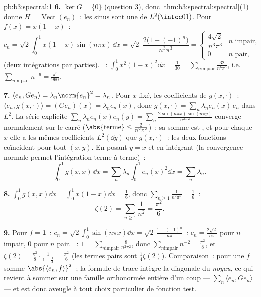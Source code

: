 \begin{solution}{pb:b3:spectral:1}
\textbf{6.} $\ker G = \{0\}$ (question 3), donc
\cref{thm:b3:spectral:spectral}(1) donne $H =
\overline{\operatorname{Vect}}(e_n)$~: les sinus sont une
 de $L^2(\intcc01)$. Pour $f(x) = x(1 -
x)$~:
\[
c_n = \sqrt2\int_0^1x(1-x)\sin(n\pi x)\,\dd x
= \sqrt2\;\frac{2\bigl(1 - (-1)^n\bigr)}{n^3\pi^3}
= \begin{cases}\dfrac{4\sqrt2}{n^3\pi^3} & n \text{ impair},\\
0 & n \text{ pair},\end{cases}
\]
(deux intégrations par parties). ~:
$\int_0^1x^2(1-x)^2\dd x = \frac1{30} = \sum_{n \text{
impair}}\frac{32}{n^6\pi^6}$, i.e.\ $\sum_{n\text{
impair}}n^{-6} = \frac{\pi^6}{960}$.

\textbf{7.} $\langle e_n, Ge_n\rangle = \lambda_n\norm{e_n}^2
= \lambda_n$. Pour $x$ fixé, les coefficients de $g(x,
\cdot)$~: $\langle e_n, g(x,\cdot)\rangle = (Ge_n)(x) =
\lambda_ne_n(x)$, donc $g(x,\cdot) =
\sum_n\lambda_ne_n(x)\,e_n$ dans $L^2$. La série explicite
$\sum_n\lambda_ne_n(x)e_n(y) = \sum_n\frac{2\sin(n\pi
x)\sin(n\pi y)}{n^2\pi^2}$ converge normalement sur le carré
($\abs{\text{terme}} \leq \frac2{n^2\pi^2}$)~: sa somme est
, et pour chaque $x$ elle a les mêmes coefficients
$L^2(\dd y)$ que $g(x, \cdot)$~: les deux fonctions
 coïncident pour tout $(x, y)$. En posant $y = x$
et en intégrant (la convergence normale permet
l'intégration terme à terme)~:
\[
\int_0^1g(x,x)\,\dd x =
\sum_n\lambda_n\int_0^1e_n(x)^2\dd x = \sum_n\lambda_n .
\]

\textbf{8.} $\int_0^1g(x,x)\dd x = \int_0^1x(1 - x)\dd x =
\frac16$, donc $\sum_{n\geq1}\frac1{n^2\pi^2} = \frac16$~:
\[
\zeta(2) = \sum_{n\geq1}\frac1{n^2} = \frac{\pi^2}6 .
\]

\textbf{9.} Pour $f = \mathbf 1$~: $c_n =
\sqrt2\int_0^1\sin(n\pi x)\dd x = \sqrt2\,\frac{1 -
(-1)^n}{n\pi}$~: $c_n = \frac{2\sqrt2}{n\pi}$ pour $n$
impair, $0$ pour $n$ pair. ~: $1 = \sum_{n\text{
impair}}\frac{8}{n^2\pi^2}$, donc $\sum_{n\text{
impair}}n^{-2} = \frac{\pi^2}8$, et $\zeta(2) =
\frac{\pi^2}8\cdot\frac{1}{1 - \frac14} = \frac{\pi^2}6$
(les termes pairs sont $\frac14\zeta(2)$). Comparaison~:
 pour une $f$ somme $\abs{\langle e_n, f\rangle}^2$~;
la formule de trace intègre la diagonale du \emph{noyau},
ce qui revient à sommer  sur une famille orthonormée
entière d'un coup --- $\sum_n\langle e_n, Ge_n\rangle$ --- et
est donc aveugle à tout choix particulier de fonction test.


\end{solution}
